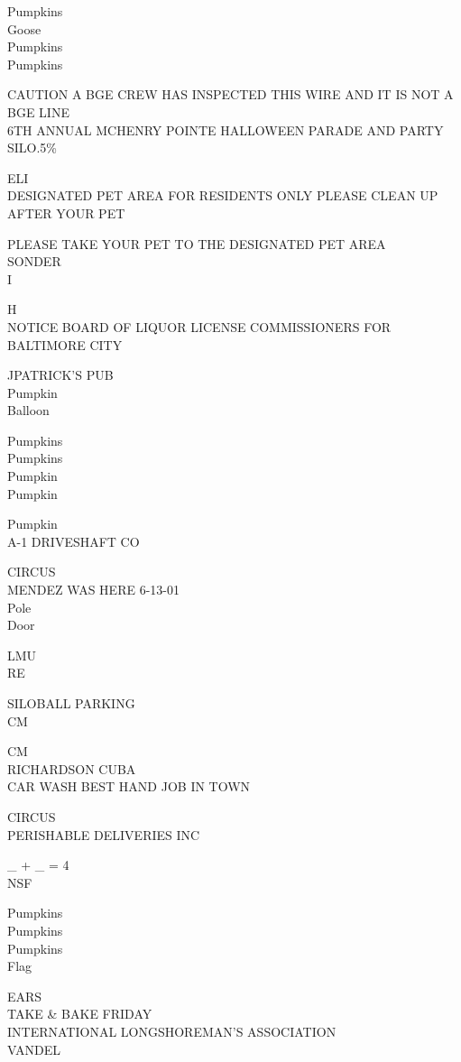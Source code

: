 \documentclass[10pt,letterpaper]{article}
\begin{document}
Pumpkins\\
Goose\\
Pumpkins\\
Pumpkins

CAUTION A BGE CREW HAS INSPECTED THIS WIRE AND IT IS NOT A BGE LINE\\
6TH ANNUAL MCHENRY POINTE HALLOWEEN PARADE AND PARTY\\
SILO.5\%

ELI\\
DESIGNATED PET AREA FOR RESIDENTS ONLY PLEASE CLEAN UP AFTER YOUR PET

PLEASE TAKE YOUR PET TO THE DESIGNATED PET AREA\\
SONDER\\
I

H\\
NOTICE BOARD OF LIQUOR LICENSE COMMISSIONERS FOR BALTIMORE CITY

JPATRICK'S PUB\\
Pumpkin\\
Balloon

Pumpkins\\
Pumpkins\\
Pumpkin\\
Pumpkin

Pumpkin\\
A{-}1 DRIVESHAFT CO

CIRCUS\\
MENDEZ WAS HERE 6{-}13{-}01\\
Pole\\
Door

LMU\\
RE

SILOBALL PARKING\\
CM

CM\\
RICHARDSON CUBA\\
CAR WASH BEST HAND JOB IN TOWN

CIRCUS\\
PERISHABLE DELIVERIES INC

\_ + \_ = 4\\
NSF

Pumpkins\\
Pumpkins\\
Pumpkins\\
Flag

EARS\\
TAKE \& BAKE FRIDAY\\
INTERNATIONAL LONGSHOREMAN'S ASSOCIATION\\
VANDEL
\end{document}
